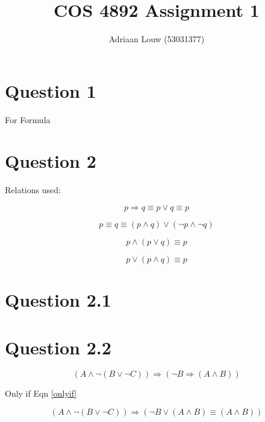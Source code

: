 \documentclass[10pt,a4paper]{article}
\title{COS 4892 Assignment 1}
\author{Adriaan Louw (53031377)}
\begin{document}
\maketitle

\section{Question 1}

For Formula





\section{Question 2}
Relations used:

\begin{equation}
 p \Rightarrow q \equiv p \vee q \equiv p
 \label{onlyif}
\end{equation}

\begin{equation}
 p \equiv q \equiv ( p \wedge q) \vee (\neg p \wedge \neg q)
 \label{DNF}
\end{equation}

\begin{equation}
 p \wedge ( p \vee q) \equiv p
 \label{absorbtion1}
\end{equation}

\begin{equation}
 p \vee ( p \wedge q) \equiv p
 \label{absorbtion2}
\end{equation}

\section{Question 2.1}


\section{Question 2.2}

\begin{equation}
 (A \wedge \neg(B\vee \neg C)) \Rightarrow (\neg B \Rightarrow (A\wedge B))
\end{equation}

Only if Eqn \ref{onlyif}

\begin{equation}
 (A \wedge \neg(B\vee \neg C)) \Rightarrow (\neg B \vee (A\wedge B)\equiv (A\wedge B))
\end{equation}
\end{document}
